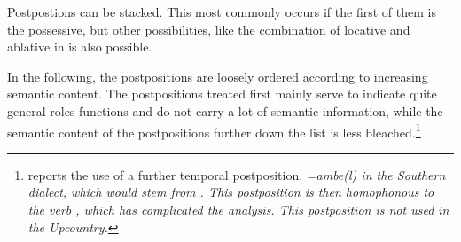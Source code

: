 

% 

Postpostions can be stacked. This most commonly occurs if the first of them is the possessive, but other possibilities, like the combination of locative and ablative in  is also possible.



In the following, the postpositions are loosely ordered according to increasing semantic content. The  postpositions treated first mainly serve to indicate quite general roles functions and do not carry a lot of semantic information, while the semantic content of the postpositions further down the list is less bleached.\footnote{\citet{Slomanson2008ismil} reports the
	use of a further temporal postposition, \em =ambe(l) \em  in the Southern dialect, which would stem from . This postposition is then homophonous to the verb , which has complicated the analysis. This postposition is not used in the Upcountry.}



